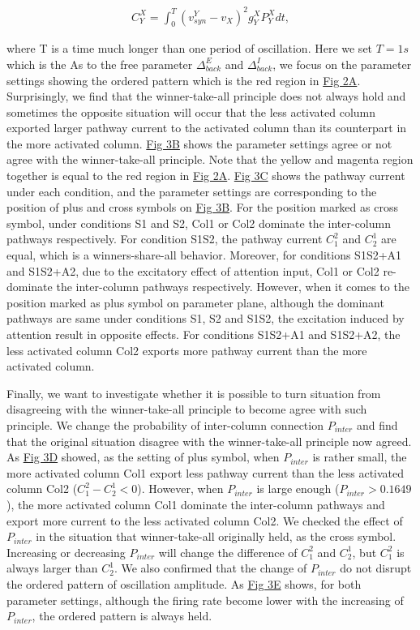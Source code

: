 \documentclass[10pt,letterpaper]{article}
\begin{document}
\begin{eqnarray}
\label{eq:6}
    C_{Y}^{X} = \int_{0}^{T}(v_{syn}^{Y}-v_{X})^{2}g_{Y}^{X}P_{Y}^{X}dt,
\end{eqnarray}

where T is a time much longer than one period of oscillation. Here we set $T=1s$ which is the As to the free parameter $\Delta_{back}^{E}$ and $\Delta_{back}^{I}$, we focus on the parameter settings showing the ordered pattern which is the red region in \hyperlink{fig:fig2}{Fig 2A}. Surprisingly, we find that the winner-take-all principle does not always hold and sometimes the opposite situation will occur that the less activated column exported larger pathway current to the activated column than its counterpart in the more activated column. \hyperlink{fig:fig3}{Fig 3B} shows the parameter settings agree or not agree with the winner-take-all principle. Note that the yellow and magenta region together is equal to the red region in \hyperlink{fig:fig2}{Fig 2A}. \hyperlink{fig:fig3}{Fig 3C} shows the pathway current under each condition, and the parameter settings are corresponding to the position of plus and cross symbols on \hyperlink{fig:fig3}{Fig 3B}. For the position marked as cross symbol, under conditions S1 and S2, Col1 or Col2 dominate the inter-column pathways respectively. For condition S1S2, the pathway current $C_{1}^{2}$ and $C_{2}^{1}$ are equal, which is a winners-share-all behavior. Moreover, for conditions S1S2+A1 and S1S2+A2, due to the excitatory effect of attention input, Col1 or Col2 re-dominate the inter-column pathways respectively. However, when it comes to the position marked as plus symbol on parameter plane, although the dominant pathways are same under conditions S1, S2 and S1S2, the excitation induced by attention result in opposite effects. For conditions S1S2+A1 and S1S2+A2, the less activated column Col2 exports more pathway current than the more activated column.

Finally, we want to investigate whether it is possible to turn situation from disagreeing with the winner-take-all principle to become agree with such principle. We change the probability of inter-column connection $P_{inter}$ and find that the original situation disagree with the winner-take-all principle now agreed. As \hyperlink{fig:fig3}{Fig 3D} showed, as the setting of plus symbol, when $P_{inter}$ is rather small, the more activated column Col1 export less pathway current than the less activated column Col2 ($C_{1}^{2} - C_{2}^{1} < 0$). However, when $P_{inter}$ is large enough ($P_{inter}>0.1649$), the more activated column Col1 dominate the inter-column pathways and export more current to the less activated column Col2. We checked the effect of $P_{inter}$ in the situation that winner-take-all originally held, as the cross symbol. Increasing or decreasing $P_{inter}$ will change the difference of $C_{1}^{2}$ and $C_{2}^{1}$, but $C_{1}^{2}$ is always larger than $C_{2}^{1}$. We also confirmed that the change of $P_{inter}$ do not disrupt the ordered pattern of oscillation amplitude. As \hyperlink{fig:fig3}{Fig 3E} shows, for both parameter settings, although the firing rate become lower with the increasing of $P_{inter}$, the ordered pattern is always held.
\end{document}
